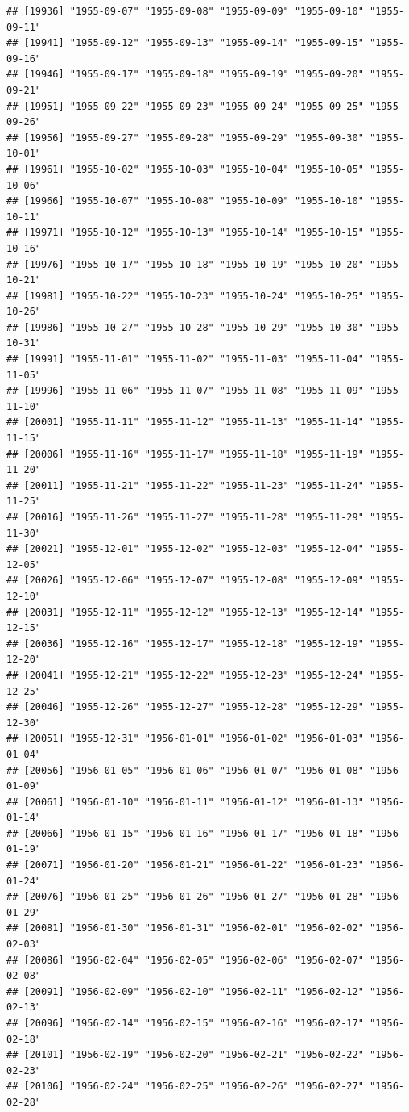 \documentclass{article}\usepackage[]{graphicx}\usepackage[]{color}
\makeatletter
\newenvironment{kframe}{%
 \def\at@end@of@kframe{}%
 \ifinner\ifhmode%
  \def\at@end@of@kframe{\end{minipage}}%
  \begin{minipage}{\columnwidth}%
 \fi\fi%
 \def\FrameCommand##1{\hskip\@totalleftmargin \hskip-\fboxsep
 \colorbox{shadecolor}{##1}\hskip-\fboxsep
     \hskip-\linewidth \hskip-\@totalleftmargin \hskip\columnwidth}%
 \MakeFramed {\advance\hsize-\width
   \@totalleftmargin\z@ \linewidth\hsize
   \@setminipage}}%
 {\par\unskip\endMakeFramed%
 \at@end@of@kframe}
\newenvironment{knitrout}{}{} %
\makeatother
\begin{document}
\begin{description}
\begin{knitrout}
\begin{kframe}
\begin{verbatim}
## [19936] "1955-09-07" "1955-09-08" "1955-09-09" "1955-09-10" "1955-09-11"
## [19941] "1955-09-12" "1955-09-13" "1955-09-14" "1955-09-15" "1955-09-16"
## [19946] "1955-09-17" "1955-09-18" "1955-09-19" "1955-09-20" "1955-09-21"
## [19951] "1955-09-22" "1955-09-23" "1955-09-24" "1955-09-25" "1955-09-26"
## [19956] "1955-09-27" "1955-09-28" "1955-09-29" "1955-09-30" "1955-10-01"
## [19961] "1955-10-02" "1955-10-03" "1955-10-04" "1955-10-05" "1955-10-06"
## [19966] "1955-10-07" "1955-10-08" "1955-10-09" "1955-10-10" "1955-10-11"
## [19971] "1955-10-12" "1955-10-13" "1955-10-14" "1955-10-15" "1955-10-16"
## [19976] "1955-10-17" "1955-10-18" "1955-10-19" "1955-10-20" "1955-10-21"
## [19981] "1955-10-22" "1955-10-23" "1955-10-24" "1955-10-25" "1955-10-26"
## [19986] "1955-10-27" "1955-10-28" "1955-10-29" "1955-10-30" "1955-10-31"
## [19991] "1955-11-01" "1955-11-02" "1955-11-03" "1955-11-04" "1955-11-05"
## [19996] "1955-11-06" "1955-11-07" "1955-11-08" "1955-11-09" "1955-11-10"
## [20001] "1955-11-11" "1955-11-12" "1955-11-13" "1955-11-14" "1955-11-15"
## [20006] "1955-11-16" "1955-11-17" "1955-11-18" "1955-11-19" "1955-11-20"
## [20011] "1955-11-21" "1955-11-22" "1955-11-23" "1955-11-24" "1955-11-25"
## [20016] "1955-11-26" "1955-11-27" "1955-11-28" "1955-11-29" "1955-11-30"
## [20021] "1955-12-01" "1955-12-02" "1955-12-03" "1955-12-04" "1955-12-05"
## [20026] "1955-12-06" "1955-12-07" "1955-12-08" "1955-12-09" "1955-12-10"
## [20031] "1955-12-11" "1955-12-12" "1955-12-13" "1955-12-14" "1955-12-15"
## [20036] "1955-12-16" "1955-12-17" "1955-12-18" "1955-12-19" "1955-12-20"
## [20041] "1955-12-21" "1955-12-22" "1955-12-23" "1955-12-24" "1955-12-25"
## [20046] "1955-12-26" "1955-12-27" "1955-12-28" "1955-12-29" "1955-12-30"
## [20051] "1955-12-31" "1956-01-01" "1956-01-02" "1956-01-03" "1956-01-04"
## [20056] "1956-01-05" "1956-01-06" "1956-01-07" "1956-01-08" "1956-01-09"
## [20061] "1956-01-10" "1956-01-11" "1956-01-12" "1956-01-13" "1956-01-14"
## [20066] "1956-01-15" "1956-01-16" "1956-01-17" "1956-01-18" "1956-01-19"
## [20071] "1956-01-20" "1956-01-21" "1956-01-22" "1956-01-23" "1956-01-24"
## [20076] "1956-01-25" "1956-01-26" "1956-01-27" "1956-01-28" "1956-01-29"
## [20081] "1956-01-30" "1956-01-31" "1956-02-01" "1956-02-02" "1956-02-03"
## [20086] "1956-02-04" "1956-02-05" "1956-02-06" "1956-02-07" "1956-02-08"
## [20091] "1956-02-09" "1956-02-10" "1956-02-11" "1956-02-12" "1956-02-13"
## [20096] "1956-02-14" "1956-02-15" "1956-02-16" "1956-02-17" "1956-02-18"
## [20101] "1956-02-19" "1956-02-20" "1956-02-21" "1956-02-22" "1956-02-23"
## [20106] "1956-02-24" "1956-02-25" "1956-02-26" "1956-02-27" "1956-02-28"

\end{verbatim}
\end{kframe}
\end{knitrout}
\end{description}
\end{document}
